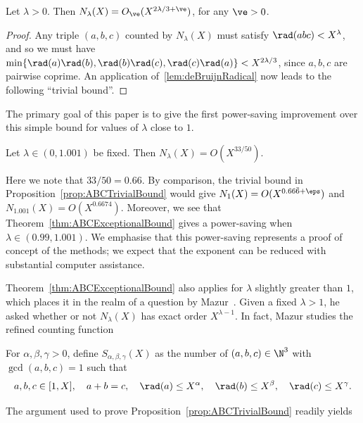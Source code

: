 \begin{proposition}\label{prop:ABCTrivialBound}
  Let $\lambda>0$. Then
  $N_\lambda(X)=O_\ve( X^{2\lambda/3+\ve})$,
  for any $\ve>0$.
  \end{proposition}
\begin{proof}
  Any triple $(a,b,c)$ counted by
  $N_\lambda(X)$ must satisfy $\rad(abc)< X^{\lambda}$, and so
  we must have
  $\min\{\rad(a)\rad(b),\rad(b)\rad(c),\rad(c)\rad(a)\}< X^{2\lambda/3}$, since $a,b,c$ are pairwise coprime.
  An application of~\ref{lem:deBruijnRadical} now leads to the following ``trivial bound''.
\end{proof}

The primary goal of this paper is to give the first power-saving improvement over this simple bound for values of $\lambda$ close to $1$.


\begin{theorem}\label{thm:ABCExceptionalBound}
Let $\lambda\in (0, 1.001)$ be fixed. Then
$N_\lambda(X)=O( X^{33/50})$.
\end{theorem}

Here we note that $33/50=0.66$. By comparison, the trivial bound in Proposition~\ref{prop:ABCTrivialBound} would give $N_1(X)=O(X^{0.66\bar{6}+\eps})$ and $N_{1.001}(X)=O(X^{0.6674})$.
Moreover, we see that Theorem~\ref{thm:ABCExceptionalBound} gives a power-saving when $\lambda\in (0.99,1.001)$. We emphasise that this power-saving represents a proof of concept of the methods; we expect that the exponent can be reduced with substantial computer assistance.


 Theorem~\ref{thm:ABCExceptionalBound} also applies for $\lambda$ slightly greater than $1$,
 which places it in the realm of a question by Mazur~\cite{mazur}.
Given a fixed $\lambda>1$, he asked whether or not
$ N_\lambda(X)$ has exact order
 $ X^{\lambda-1}$.
 In fact, Mazur studies
 the refined counting function

\begin{definition}\label{def:Sabc}
For $\alpha,\beta,\gamma>0$, define $S_{\alpha,\beta,\gamma}(X)$
as the number of
 $(a,b,c)\in \N^3$
with $\gcd(a,b,c)=1$ such that
 \[
 a,b,c\in [1,X], \quad a+b=c, \quad \rad(a)\leq X^\alpha, \quad
 \rad(b)\leq X^\beta, \quad
 \rad(c)\leq X^\gamma.
 \]
\end{definition}

The argument used to prove Proposition~\ref{prop:ABCTrivialBound} readily yields

